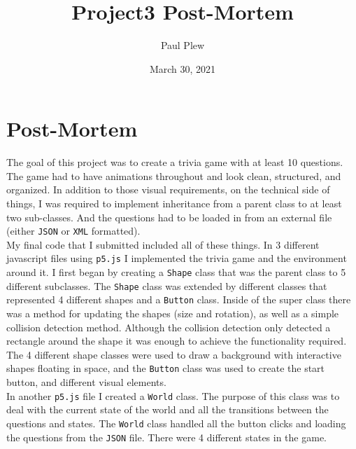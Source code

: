 \documentclass[12 pt]{report}
\title{Project3 Post-Mortem}
\author{Paul Plew}
\date{March 30, 2021}
\begin{document}
\maketitle

\section{Post-Mortem}
\hspace{\parindent} The goal of this project was to create a trivia game with at least 10 questions. The game had to have animations throughout and look clean, structured, and organized. In addition to those visual requirements, on the technical side of things, I was required to implement inheritance from a parent class to at least two sub-classes. And the questions had to be loaded in from an external file (either \verb|JSON| or \verb|XML| formatted).\\
\hspace{\parindent} My final code that I submitted included all of these things. In 3 different javascript files using \verb|p5.js| I implemented the trivia game and the environment around it. I first began by creating a \verb|Shape| class that was the parent class to 5 different subclasses. The \verb|Shape| class was extended by different classes that represented 4 different shapes and a \verb|Button| class. Inside of the super class there was a method for updating the shapes (size and rotation), as well as a simple collision detection method. Although the collision detection only detected a rectangle around the shape it was enough to achieve the functionality required. The 4 different shape classes were used to draw a background with interactive shapes floating in space, and the \verb|Button| class was used to create the start button, and different visual elements. \\
\hspace{\parindent} In another \verb|p5.js| file I created a \verb|World| class. The purpose of this class was to deal with the current state of the world and all the transitions between the questions and states. The \verb|World| class handled all the button clicks and loading the questions from the \verb|JSON| file. There were 4 different states in the game. \\
\end{document}
